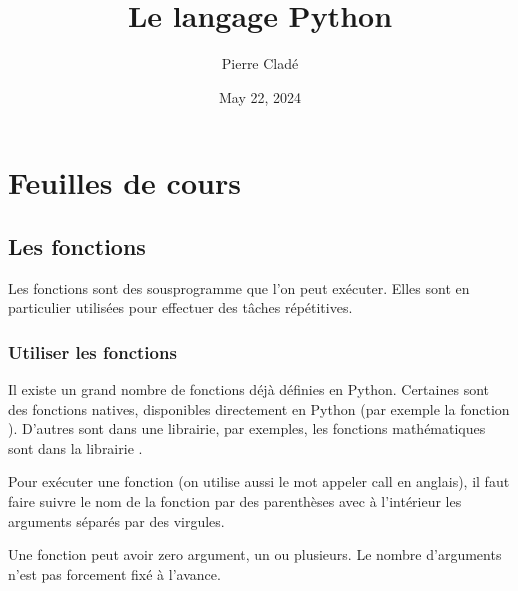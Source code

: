 \documentclass[letterpaper,10pt,english]{sphinxhowto}
\title{Le langage Python}
\date{May 22, 2024}
\author{Pierre Cladé}
\begin{document}
\pagestyle{empty}
\sphinxmaketitle
\pagestyle{plain}

\pagestyle{normal}
\label{\detokenize{index::doc}}



\section{Feuilles de cours}
\label{\detokenize{feuilles_de_cours:feuilles-de-cours}}\label{\detokenize{feuilles_de_cours::doc}}

\subsection{Les fonctions}
\label{\detokenize{cours1_fonctions_cours:les-fonctions}}\label{\detokenize{cours1_fonctions_cours::doc}}
\sphinxAtStartPar
Les fonctions sont des sous\sphinxhyphen{}programme que l’on peut exécuter. Elles sont en particulier utilisées pour effectuer des tâches répétitives.


\subsubsection{Utiliser les fonctions}
\label{\detokenize{cours1_fonctions_cours:utiliser-les-fonctions}}
\sphinxAtStartPar
Il existe un grand nombre de fonctions déjà définies en Python. Certaines sont des fonctions natives, disponibles directement en Python (par exemple la fonction ). D’autres sont dans une librairie, par exemples, les fonctions mathématiques sont dans la librairie .

\sphinxAtStartPar
Pour exécuter une fonction (on utilise aussi le mot appeler \sphinxhyphen{} call en anglais), il faut faire suivre le nom de la fonction par des parenthèses avec à l’intérieur les arguments séparés par des virgules.

\sphinxAtStartPar
Une fonction peut avoir zero argument, un ou plusieurs. Le nombre d’arguments n’est pas forcement fixé à l’avance.

\begin{sphinxVerbatim}[commandchars=\\\{\}]
 

    
 

  
\end{sphinxVerbatim}
\end{document}
